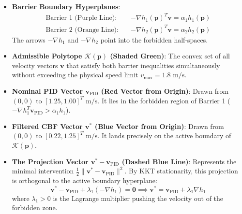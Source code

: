 \documentclass[11pt,a4paper]{article}
\begin{document}
\begin{vectorbox}
\begin{itemize}
    \item \textbf{Barrier Boundary Hyperplanes}:
    \begin{align*}
    \text{Barrier 1 (Purple Line)}: \quad & -\nabla h_1(\mathbf{p})^T \mathbf{v} = \alpha_1 h_1(\mathbf{p}) \\
    \text{Barrier 2 (Orange Line)}: \quad & -\nabla h_2(\mathbf{p})^T \mathbf{v} = \alpha_2 h_2(\mathbf{p})
    \end{align*}
    The arrows $-\nabla h_1$ and $-\nabla h_2$ point into the forbidden half-spaces.
    
    \item \textbf{Admissible Polytope $\mathcal{K}(\mathbf{p})$ (Shaded Green)}:
    The convex set of all velocity vectors $\mathbf{v}$ that satisfy both barrier inequalities simultaneously without exceeding the physical speed limit $v_{\max} = 1.8\text{ m/s}$.
    
    \item \textbf{Nominal PID Vector $\mathbf{v}_{\mathrm{PID}}$ (Red Vector from Origin)}:
    Drawn from $(0, 0)$ to $[1.25, 1.00]^T\text{ m/s}$. It lies in the forbidden region of Barrier 1 ($-\nabla h_1^T \mathbf{v}_{\mathrm{PID}} > \alpha_1 h_1$).
    
    \item \textbf{Filtered CBF Vector $\mathbf{v}^*$ (Blue Vector from Origin)}:
    Drawn from $(0, 0)$ to $[0.22, 1.25]^T\text{ m/s}$. It lands precisely on the active boundary of $\mathcal{K}(\mathbf{p})$.
    
    \item \textbf{The Projection Vector $\mathbf{v}^* - \mathbf{v}_{\mathrm{PID}}$ (Dashed Blue Line)}:
    Represents the minimal intervention $\frac{1}{2} \|\mathbf{v}^* - \mathbf{v}_{\mathrm{PID}}\|^2$. By KKT stationarity, this projection is orthogonal to the active boundary hyperplane:
    \begin{equation}
    \mathbf{v}^* - \mathbf{v}_{\mathrm{PID}} + \lambda_1 (-\nabla h_1) = \mathbf{0} \implies \mathbf{v}^* = \mathbf{v}_{\mathrm{PID}} + \lambda_1 \nabla h_1
    \end{equation}
    where $\lambda_1 > 0$ is the Lagrange multiplier pushing the velocity out of the forbidden zone.
\end{itemize}
\end{vectorbox}
\end{document}
